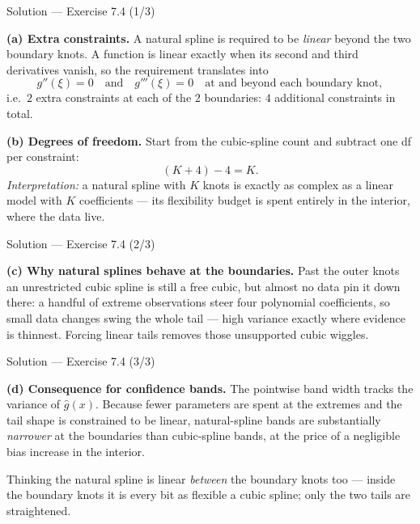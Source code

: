 \documentclass[aspectratio=169,11pt]{beamer}
\begin{document}
\begin{frame}{Solution --- Exercise 7.4 (1/3)}
\begin{solutionbox}
\textbf{(a) Extra constraints.} A natural spline is required to be \emph{linear} beyond the two boundary knots. A function is linear exactly when its second and third derivatives vanish, so the requirement translates into
\[ g''(\xi)=0 \quad\text{and}\quad g'''(\xi)=0 \quad \text{at and beyond each boundary knot}, \]
i.e.\ $2$ extra constraints at each of the $2$ boundaries: $4$ additional constraints in total.

\medskip
\textbf{(b) Degrees of freedom.} Start from the cubic-spline count and subtract one df per constraint:
\[ (K+4)-4 = K. \]
\emph{Interpretation:} a natural spline with $K$ knots is exactly as complex as a linear model with $K$ coefficients --- its flexibility budget is spent entirely in the interior, where the data live.
\end{solutionbox}
\end{frame}

\begin{frame}{Solution --- Exercise 7.4 (2/3)}
\begin{solutionbox}
\textbf{(c) Why natural splines behave at the boundaries.} Past the outer knots an unrestricted cubic spline is still a free cubic, but almost no data pin it down there: a handful of extreme observations steer four polynomial coefficients, so small data changes swing the whole tail --- high variance exactly where evidence is thinnest. Forcing linear tails removes those unsupported cubic wiggles.
\end{solutionbox}
\end{frame}

\begin{frame}{Solution --- Exercise 7.4 (3/3)}
\begin{solutionbox}
\medskip
\textbf{(d) Consequence for confidence bands.} The pointwise band width tracks the variance of $\hat g(x)$. Because fewer parameters are spent at the extremes and the tail shape is constrained to be linear, natural-spline bands are substantially \emph{narrower} at the boundaries than cubic-spline bands, at the price of a negligible bias increase in the interior.
\end{solutionbox}
\begin{mistake}
Thinking the natural spline is linear \emph{between} the boundary knots too --- inside the boundary knots it is every bit as flexible a cubic spline; only the two tails are straightened.
\end{mistake}
\end{frame}
\end{document}
